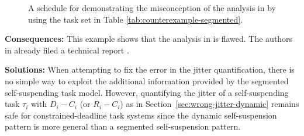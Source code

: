 \begin{figure}[t]
{}       
\caption{A schedule for demonstrating the misconception of the analysis in \cite{RTCSA-BletsasA05} by using the task set in Table  \ref{tab:counterexample-segmented}. }
\label{fig:counterexample-segmented}
\end{figure}


{\bf Consequences:} This example shows that the analysis in \cite{RTCSA-BletsasA05} is flawed.  The authors in \cite{RTCSA-BletsasA05}  already filed a technical report \cite{BletsasReport2015}.

{\bf Solutions:} When attempting to fix the error in the jitter quantification, there is no simple way to exploit the additional 
information provided by the segmented self-suspending task model.
However, quantifying the jitter of a self-suspending task $\tau_i$ with $D_i-C_i$ (or $R_i-C_i$) as in Section~\ref{sec:wrong-jitter-dynamic}  remains safe for constrained-deadline task systems since the dynamic self-suspension pattern is more general than a segmented self-suspension pattern.

\label{sec:wrong-critical}

